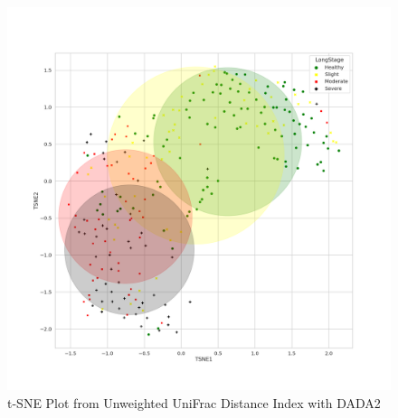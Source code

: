 \documentclass[a4paper]{article}
\begin{document}
            \begin{figure}[p]
                \centering
                \includegraphics[width=0.6 \linewidth]{figures/BetaDiversity/DADA2.unweighted_unifrac.png}
                \caption{t-SNE Plot from Unweighted UniFrac Distance Index with DADA2}
                \label{fig:tsne-unweighted-dada2}
            \end{figure}
\end{document}
